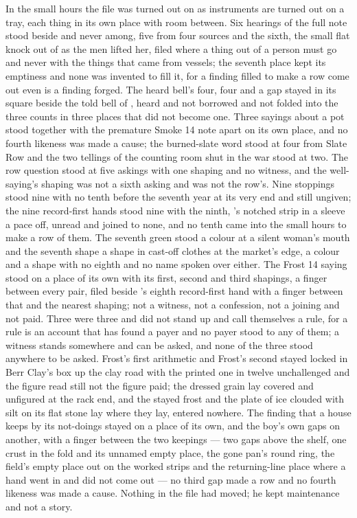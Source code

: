 \scenebreak

In the small hours the file was turned out on  as instruments are turned out on a tray, each thing in its own place with room between. Six hearings of the full note stood beside and never among, five from four sources and the sixth, the small flat knock out of  as the men lifted her, filed where a thing out of a person must go and never with the things that came from vessels; the seventh place kept its emptiness and none was invented to fill it, for a finding filled to make a row come out even is a finding forged. The heard bell's four, four and a gap stayed in its square beside the told bell of , heard and not borrowed and not folded into the three counts in three places that did not become one. Three sayings about a pot stood together with the premature Smoke 14 note apart on its own place, and no fourth likeness was made a cause; the burned-slate word stood at four from Slate Row and the two tellings of the counting room shut in the war stood at two. The row question stood at five askings with one shaping and no witness, and the well-saying's shaping was not a sixth asking and was not the row's. Nine stoppings stood nine with no tenth before the seventh year at its very end and still ungiven; the nine record-first hands stood nine with the ninth, 's notched strip in a sleeve a pace off, unread and joined to none, and no tenth came into the small hours to make a row of them. The seventh green stood a colour at a silent woman's mouth and the seventh shape a shape in cast-off clothes at the market's edge, a colour and a shape with no eighth and no name spoken over either. The Frost 14 saying stood on a place of its own with its first, second and third shapings, a finger between every pair, filed beside 's eighth record-first hand with a finger between that and the nearest shaping; not a witness, not a confession, not a joining and not paid. Three were three and did not stand up and call themselves a rule, for a rule is an account that has found a payer and no payer stood to any of them; a witness stands somewhere and can be asked, and none of the three stood anywhere to be asked. Frost's first arithmetic and Frost's second stayed locked in Berr Clay's box up the clay road with the printed one in twelve unchallenged and the figure read still not the figure paid; the dressed grain lay covered and unfigured at the rack end, and the stayed frost and the plate of ice clouded with silt on its flat stone lay where they lay, entered nowhere. The finding that a house keeps by its not-doings stayed on a place of its own, and the boy's own gaps on another, with a finger between the two keepings --- two gaps above the shelf, one crust in the fold and its unnamed empty place, the gone pan's round ring, the field's empty place out on the worked strips and the returning-line place where a hand went in and did not come out --- no third gap made a row and no fourth likeness was made a cause. Nothing in the file had moved; he kept maintenance and not a story.

